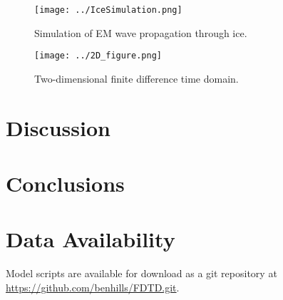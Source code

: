 \documentclass[a4paper]{article}
\begin{document}
\begin{figure}
    \centering
    \texttt{[image: ../IceSimulation.png]}
    \caption{Simulation of EM wave propagation through ice.}
    \label{fig:YeePML}
\end{figure}


\begin{figure}
    \centering
    \texttt{[image: ../2D\_figure.png]}
    \caption{Two-dimensional finite difference time domain.}
    \label{fig:YeePML}
\end{figure}


\section{Discussion}

\section{Conclusions}

\section*{Data Availability}

Model scripts are available for download as a git repository at \url{https://github.com/benhills/FDTD.git}.

\printbibliography
\end{document}
